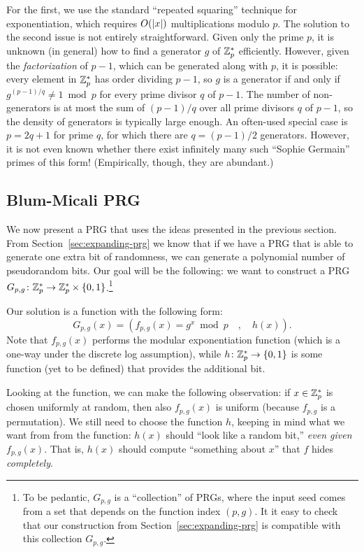 \documentclass[11pt]{article}
\begin{document}
For the first, we use the standard ``repeated squaring'' technique for
exponentiation, which requires $O(\lvert x\rvert)$ multiplications modulo
$p$.  The solution to the second issue is not entirely
straightforward.  Given only the prime $p$, it is unknown (in general)
how to find a generator $g$ of $\mathbb{Z}_p^{*}$ efficiently.  However, given
the \emph{factorization} of $p-1$, which can be generated along with
$p$, it is possible: every element in $\mathbb{Z}_p^{*}$ has order dividing
$p-1$, so $g$ is a generator if and only if $g^{(p-1)/q} \neq 1 \bmod
p$ for every prime divisor $q$ of $p-1$.  The number of non-generators
is at most the sum of $(p-1)/q$ over all prime divisors $q$ of $p-1$,
so the density of generators is typically large enough.  An often-used
special case is $p = 2q+1$ for prime $q$, for which there are $q =
(p-1)/2$ generators.  However, it is not even known whether there
exist infinitely many such ``Sophie Germain'' primes of this form!
(Empirically, though, they are abundant.)

\subsection{Blum-Micali PRG}
\label{sec:blum-micali-prg}

We now present a PRG that uses the ideas presented in the previous
section.  From Section~\ref{sec:expanding-prg} we know that if we have
a PRG that is able to generate one extra bit of randomness, we can
generate a polynomial number of pseudorandom bits.  Our goal will be
the following: we want to construct a PRG $G_{p,g} \colon \mathbb{Z}_p^* \to
\mathbb{Z}_p^* \times \{0,1\}$.\footnote{To be pedantic, $G_{p,g}$ is a
  ``collection'' of PRGs, where the input seed comes from a set that
  depends on the function index $(p,g)$.  It it easy to check that our
  construction from Section~\ref{sec:expanding-prg} is compatible with
  this collection $G_{p,g}$.}

Our solution is a function with the following form: \[ G_{p,g}(x)=
(f_{p,g}(x)=g^x \bmod p \quad, \quad h(x)). \] Note that $f_{p,g}(x)$
performs the modular exponentiation function (which is a one-way under
the discrete log assumption), while $h \colon \mathbb{Z}_p^{*} \to \{0,1\}$ is
some function (yet to be defined) that provides the additional bit.

Looking at the function, we can make the following observation: if $x
\in \mathbb{Z}_p^{*}$ is chosen uniformly at random, then also $f_{p,g}(x)$ is
uniform (because $f_{p,g}$ is a permutation).  We still need to choose
the function $h$, keeping in mind what we want from from the function:
$h(x)$ should ``look like a random bit,'' \emph{even given
  $f_{p,g}(x)$}.  That is, $h(x)$ should compute ``something about
$x$'' that $f$ hides \emph{completely}.
\end{document}
